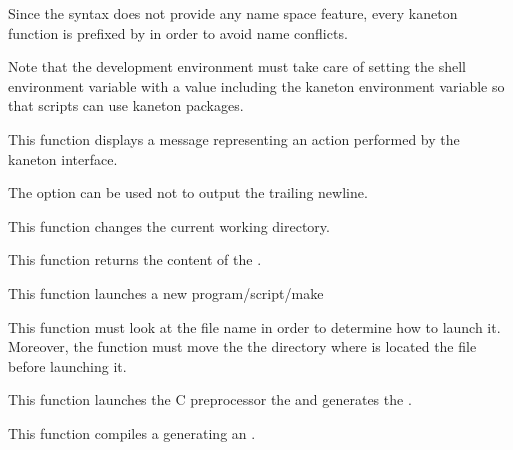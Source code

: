 Since the  syntax does not provide any name space feature,
every kaneton  function is prefixed by  in order
to avoid name conflicts.

Note that the  development environment must take care of
setting the  shell environment variable with a value
including the  kaneton environment variable
so that scripts can use kaneton  packages.

         {
	   This function displays a message representing an action performed
	   by the kaneton  interface.

	   \-

	   The option  can be used not to
	   output the trailing newline.
	 }

         {
	   This function changes the current working directory.
	 }

         {
	   This function returns the content of the .
	 }

         {
	   This function launches a new program/script/make \etc{}

	   \-

	   This function must look at the file name in order to determine
	   how to launch it. Moreover, the function must move the the
	   directory where is located the file before launching it.
	 }

         {
	   This function launches the C preprocessor the 
	   and generates the .
	 }

         {
	   This function compiles a  generating an
	   .
	 }

